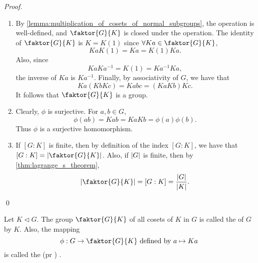 \begin{proof}
  \begin{enumerate}
    \item By \cref{lemma:multiplication_of_cosets_of_normal_subgroups}, the operation is well-defined, and $\faktor{G}{K}$ is closed under the operation. The identity of $\faktor{G}{K}$ is $K = K(1)$ since $\forall Ka \in \faktor{G}{K}$,
      \begin{equation*}
        Ka K(1) = Ka = K(1) Ka.
      \end{equation*}
      Also, since
      \begin{equation*}
        Ka Ka^{-1} = K(1) = Ka^{-1} Ka,
      \end{equation*}
      the inverse of $Ka$ is $Ka^{-1}$. Finally, by associativity of $G$, we have that
      \begin{equation*}
        Ka(KbKc) = Kabc = (KaKb)Kc.
      \end{equation*}
      It follows that $\faktor{G}{K}$ is a group.

    \item Clearly, $\phi$ is surjective. For $a, b \in G$,
      \begin{equation*}
        \phi(ab) = Kab = Ka Kb = \phi(a) \phi(b).
      \end{equation*}
      Thus $\phi$ is a surjective homomorphism.

    \item If $[G : K]$ is finite, then by definition of the index $[G : K]$, we have that $[G : K] = \abs{\faktor{G}{K}}$. Also, if $\left|G\right|$ is finite, then by \cref{thm:lagrange_s_theorem},
      \begin{equation*}
        \abs{\faktor{G}{K}} = [G : K] = \frac{\abs{G}}{\abs{K}}.
      \end{equation*}
  \end{enumerate}\qed
\end{proof}

\begin{defn}
\label{defn:quotient_group}
  Let $K \triangleleft G$. The group $\faktor{G}{K}$ of all cosets of $K$ in $G$ is called the  of $G$ by $K$. Also, the mapping
  \begin{equation*}
    \phi: G \to \faktor{G}{K} \text{ defined by } a \mapsto Ka
  \end{equation*}
  is called the  (pr ) .
\end{defn}

